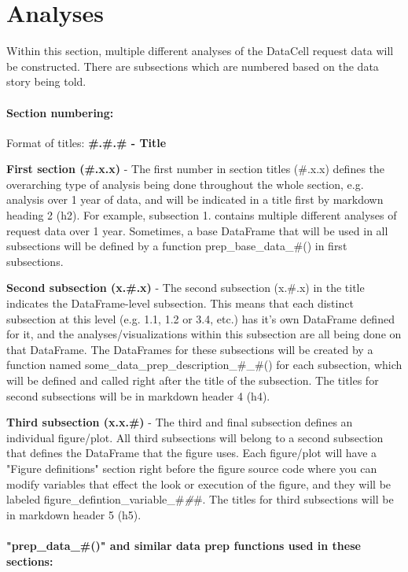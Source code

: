 \documentclass[11pt]{article}
\begin{document}
    \section{Analyses}\label{analyses}

    Within this section, multiple different analyses of the DataCell request
data will be constructed. There are subsections which are numbered based
on the data story being told.

\paragraph{Section numbering:}\label{section-numbering}

Format of titles: \textbf{\#.\#.\# - Title}

\textbf{First section (\#.x.x)} - The first number in section titles
(\#.x.x) defines the overarching type of analysis being done throughout
the whole section, e.g. analysis over 1 year of data, and will be
indicated in a title first by markdown heading 2 (h2). For example,
subsection 1. contains multiple different analyses of request data over
1 year. Sometimes, a base DataFrame that will be used in all subsections
will be defined by a function prep\_base\_data\_\#() in first
subsections.

\textbf{Second subsection (x.\#.x)} - The second subsection (x.\#.x) in
the title indicates the DataFrame-level subsection. This means that each
distinct subsection at this level (e.g. 1.1, 1.2 or 3.4, etc.) has it's
own DataFrame defined for it, and the analyses/visualizations within
this subsection are all being done on that DataFrame. The DataFrames for
these subsections will be created by a function named
some\_data\_prep\_description\_\#\_\#() for each subsection, which will
be defined and called right after the title of the subsection. The
titles for second subsections will be in markdown header 4 (h4).

\textbf{Third subsection (x.x.\#)} - The third and final subsection
defines an individual figure/plot. All third subsections will belong to
a second subsection that defines the DataFrame that the figure uses.
Each figure/plot will have a "Figure definitions" section right before
the figure source code where you can modify variables that effect the
look or execution of the figure, and they will be labeled
figure\_defintion\_variable\_\#\emph{\#}\#. The titles for third
subsections will be in markdown header 5 (h5).

\paragraph{"prep\_data\_\#()" and similar data prep functions used in
these
sections:}\label{prep_data_-and-similar-data-prep-functions-used-in-these-sections}
\end{document}
